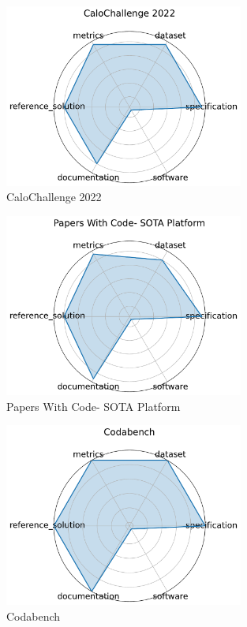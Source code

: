 \documentclass{article}
\begin{document}
\begin{figure}[h!]
  \centering
  \includegraphics[width=0.7\textwidth]{CaloChallenge 2022_radar.pdf}
  \caption{CaloChallenge 2022 \cite{krause2024calochallenge2022communitychallenge}}
\end{figure}

\begin{figure}[h!]
  \centering
  \includegraphics[width=0.7\textwidth]{Papers With Code- SOTA Platform_radar.pdf}
  \caption{Papers With Code- SOTA Platform \cite{pwc2025}}
\end{figure}

\begin{figure}[h!]
  \centering
  \includegraphics[width=0.7\textwidth]{Codabench_radar.pdf}
  \caption{Codabench \cite{xu2021codabench}}
\end{figure}
\end{document}
